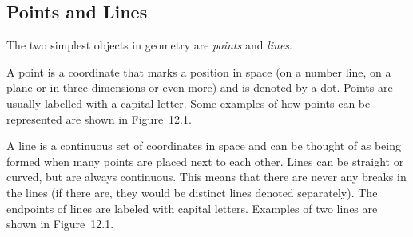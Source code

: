             \subsection{ Points and Lines}
            \nopagebreak
      \label{m39370*id313683}The two simplest objects in geometry are \textsl{points} and \textsl{lines}.\par 
      \label{m39370*id313697}A point is a coordinate that marks a position in space (on a number line, on a plane or in three dimensions or even more) and is denoted by a dot. Points are usually labelled with a capital letter. Some examples of how points can be represented are shown in Figure~12.1.\par 
      \label{m39370*id313707}A line is a continuous set of coordinates in space and can be thought of as being formed when many points are placed next to each other. Lines can be straight or curved, but are always continuous. This means that there are never any breaks in the lines (if there are, they would be distinct lines denoted separately). The endpoints of lines are labeled with capital letters. Examples of two lines are shown in Figure~12.1.\par 
    \setcounter{subfigure}{0}
